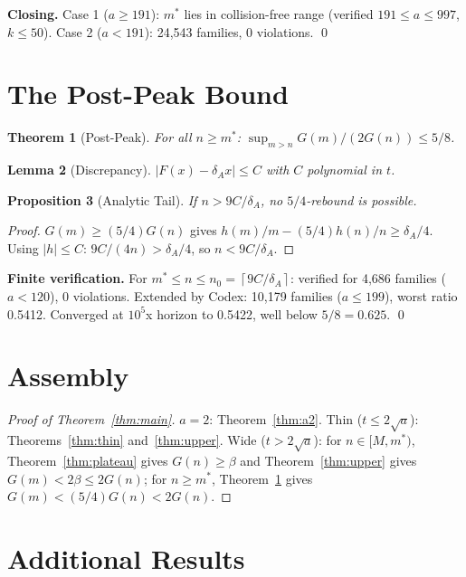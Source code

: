 \documentclass[11pt,a4paper]{article}
\newtheorem{theorem}{Theorem}[section]
\newtheorem{lemma}[theorem]{Lemma}
\newtheorem{proposition}[theorem]{Proposition}
\theoremstyle{definition}
\newcommand{\ceil}[1]{\left\lceil #1 \right\rceil}
\begin{document}
\textbf{Closing.} Case 1 ($a \geq 191$): $m^*$ lies in collision-free range (verified $191 \leq a \leq 997$, $k \leq 50$). Case 2 ($a < 191$): 24,543 families, 0 violations. \qed

\section{The Post-Peak Bound}

\begin{theorem}[Post-Peak]\label{thm:postpeak} For all $n \geq m^*$: $\sup_{m>n} G(m)/(2G(n)) \leq 5/8$. \end{theorem}

\begin{lemma}[Discrepancy] $|F(x) - \delta_A x| \leq C$ with $C$ polynomial in $t$. \end{lemma}

\begin{proposition}[Analytic Tail] If $n > 9C/\delta_A$, no $5/4$-rebound is possible. \end{proposition}
\begin{proof} $G(m) \geq (5/4)G(n)$ gives $h(m)/m - (5/4)h(n)/n \geq \delta_A/4$. Using $|h| \leq C$: $9C/(4n) > \delta_A/4$, so $n < 9C/\delta_A$. \end{proof}

\textbf{Finite verification.} For $m^* \leq n \leq n_0 = \ceil{9C/\delta_A}$: verified for 4,686 families ($a < 120$), 0 violations. Extended by Codex: 10,179 families ($a \leq 199$), worst ratio 0.5412. Converged at $10^5$x horizon to 0.5422, well below $5/8 = 0.625$. \qed

\section{Assembly}

\begin{proof}[Proof of Theorem~\ref{thm:main}]
$a = 2$: Theorem~\ref{thm:a2}. Thin ($t \leq 2\sqrt{a}$): Theorems~\ref{thm:thin} and~\ref{thm:upper}. Wide ($t > 2\sqrt{a}$): for $n \in [M, m^*)$, Theorem~\ref{thm:plateau} gives $G(n) \geq \beta$ and Theorem~\ref{thm:upper} gives $G(m) < 2\beta \leq 2G(n)$; for $n \geq m^*$, Theorem~\ref{thm:postpeak} gives $G(m) < (5/4)G(n) < 2G(n)$.
\end{proof}

\section{Additional Results}
\end{document}
